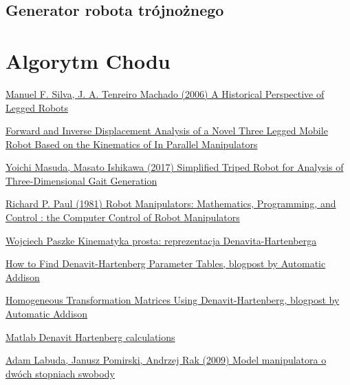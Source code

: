 \documentclass[a4paper,13pt]{article}
\begin{document}
\subsection{Generator robota trójnożnego}

\section{Algorytm Chodu}

\begin{thebibliography}{9}

\href{https://www.researchgate.net/publication/258995388_A_Historical_Perspective_of_Legged_Robots}{Manuel F. Silva, J. A. Tenreiro Machado (2006) A Historical Perspective of Legged Robots}

\href{http://www.romela.org/wp-content/uploads/2015/05/Forward-and-Inverse-Displacement-Analysis-of-a-Novel-Three-Legged-Mobile-Robot-Based-on-the-Kinematics-of-In-Parallel-Manipulators.pdf}{Forward and Inverse Displacement Analysis of a Novel Three Legged Mobile Robot Based on the Kinematics of In Parallel Manipulators}

\href{https://www.jstage.jst.go.jp/article/jrobomech/29/3/29_528/_pdf}{Yoichi Masuda, Masato Ishikawa (2017) Simplified Triped Robot for Analysis of Three-Dimensional Gait Generation}

\href{https://books.google.pl/books?id=UzZ3LAYqvRkC&redir_esc=y}{Richard P. Paul (1981) Robot Manipulators: Mathematics, Programming, and Control : the Computer Control of Robot Manipulators}

\href{http://staff.uz.zgora.pl/wpaszke/materialy/air/PRwyklad_4.pdf}{Wojciech Paszke Kinematyka prosta: reprezentacja Denavita-Hartenberga}

\href{https://automaticaddison.com/how-to-find-denavit-hartenberg-parameter-tables/}{How to Find Denavit-Hartenberg Parameter Tables, blogpost by Automatic Addison}

\href{https://automaticaddison.com/homogeneous-transformation-matrices-using-denavit-hartenberg/}{Homogeneous Transformation Matrices Using Denavit-Hartenberg, blogpost by Automatic Addison}

\href{./DH_calculations.m}{Matlab Denavit Hartenberg calculations}

\href{https://sj.umg.edu.pl/sites/default/files/ZN20.pdf}{Adam Labuda, Janusz Pomirski, Andrzej Rak (2009) Model manipulatora o dwóch stopniach swobody}


\end{thebibliography}
\end{document}
